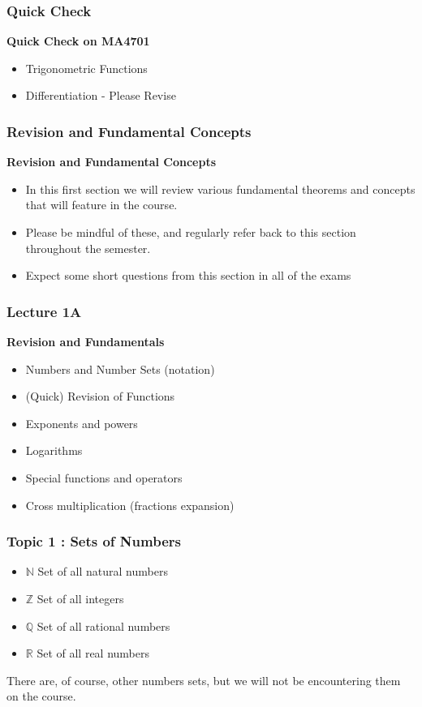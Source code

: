 \documentclass{beamer}
\begin{document}

\begin{frame}
\frametitle{Quick Check}
\large
\textbf{Quick Check on MA4701}
\begin{itemize}
\item Trigonometric Functions
\item Differentiation - Please Revise
\end{itemize}

\end{frame}


\begin{frame}
	\frametitle{Revision and Fundamental Concepts}
	\textbf{Revision and Fundamental Concepts}
	\begin{itemize}
		\item	In this first section we will review various fundamental theorems and concepts that
		will feature in the course.
		\item	Please be mindful of these, and regularly refer back to this section 
		throughout the semester.
		\item Expect some short questions from this section in all of the exams
	\end{itemize}
	
\end{frame}
\begin{frame}
	\frametitle{Lecture 1A}
	\textbf{Revision and Fundamentals}
	
	\begin{itemize}
		\item Numbers and Number Sets (notation)
		\item (Quick) Revision of Functions
		\item Exponents and powers
		\item Logarithms
		\item Special functions and operators
		\item Cross multiplication (fractions expansion)
	\end{itemize}
\end{frame}


\begin{frame}
	\frametitle{Topic 1 : Sets of Numbers}
	\large
	\begin{itemize} 
		\item $\mathbb{N}$ Set of all natural numbers
		\item $\mathbb{Z}$ Set of all integers
		\item $\mathbb{Q}$ Set of all rational numbers
		\item $\mathbb{R}$ Set of all real numbers
	\end{itemize}
	
	\bigskip There are, of course, other numbers sets, but we will not be encountering them on the course.
\end{frame}
\end{document}
